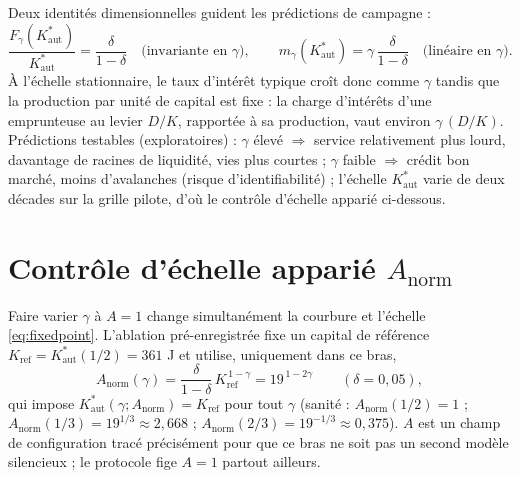 \documentclass[11pt,a4paper]{article}
\newcommand{\Kaut}{K^{*}_{\mathrm{aut}}}
\begin{document}
Deux identités dimensionnelles guident les prédictions de campagne :
\begin{equation}
\frac{F_\gamma(\Kaut)}{\Kaut}=\frac{\delta}{1-\delta}
\quad\text{(invariante en $\gamma$)},\qquad
m_\gamma(\Kaut)=\gamma\,\frac{\delta}{1-\delta}
\quad\text{(linéaire en $\gamma$)} .
\label{eq:dimensional}
\end{equation}
À l'échelle stationnaire, le taux d'intérêt typique croît donc comme
$\gamma$ tandis que la production par unité de capital est fixe : la charge
d'intérêts d'une emprunteuse au levier $D/K$, rapportée à sa production,
vaut environ $\gamma\,(D/K)$. Prédictions testables (exploratoires) :
$\gamma$ élevé $\Rightarrow$ service relativement plus lourd, davantage de
racines de liquidité, vies plus courtes ; $\gamma$ faible $\Rightarrow$
crédit bon marché, moins d'avalanches (risque d'identifiabilité) ; l'échelle
$\Kaut$ varie de deux décades sur la grille pilote, d'où le contrôle
d'échelle apparié ci-dessous.

\section{Contrôle d'échelle apparié $A_{\mathrm{norm}}$}
\label{sec:anorm}

Faire varier $\gamma$ à $A=1$ change simultanément la courbure et l'échelle
\eqref{eq:fixedpoint}. L'ablation pré-enregistrée fixe un capital de
référence $K_{\mathrm{ref}}=\Kaut(1/2)=361$ J et utilise, uniquement dans
ce bras,
\begin{equation}
A_{\mathrm{norm}}(\gamma)=\frac{\delta}{1-\delta}\,
K_{\mathrm{ref}}^{\,1-\gamma}=19^{\,1-2\gamma}
\qquad(\delta=0{,}05),
\end{equation}
qui impose $\Kaut(\gamma; A_{\mathrm{norm}})=K_{\mathrm{ref}}$ pour tout
$\gamma$ (sanité : $A_{\mathrm{norm}}(1/2)=1$ ; $A_{\mathrm{norm}}(1/3)
= 19^{1/3}\approx2{,}668$ ; $A_{\mathrm{norm}}(2/3)=19^{-1/3}\approx
0{,}375$). $A$ est un champ de configuration tracé précisément pour que ce
bras ne soit pas un second modèle silencieux ; le protocole fige $A=1$
partout ailleurs.
\end{document}

